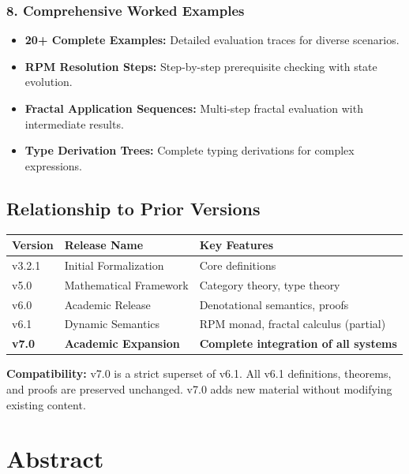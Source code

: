 \documentclass[11pt,twoside,openright]{book}
\theoremstyle{definition}
\theoremstyle{plain}
\theoremstyle{remark}
\begin{document}
\subsection*{8. Comprehensive Worked Examples}

\begin{itemize}
  \item \textbf{20+ Complete Examples:} Detailed evaluation traces for diverse scenarios.
  \item \textbf{RPM Resolution Steps:} Step-by-step prerequisite checking with state evolution.
  \item \textbf{Fractal Application Sequences:} Multi-step fractal evaluation with intermediate results.
  \item \textbf{Type Derivation Trees:} Complete typing derivations for complex expressions.
\end{itemize}

\section*{Relationship to Prior Versions}

\begin{center}
\begin{tabular}{lll}
\toprule
\textbf{Version} & \textbf{Release Name} & \textbf{Key Features} \\
\midrule
v3.2.1 & Initial Formalization & Core definitions \\
v5.0 & Mathematical Framework & Category theory, type theory \\
v6.0 & Academic Release & Denotational semantics, proofs \\
v6.1 & Dynamic Semantics & RPM monad, fractal calculus (partial) \\
\textbf{v7.0} & \textbf{Academic Expansion} & \textbf{Complete integration of all systems} \\
\bottomrule
\end{tabular}
\end{center}

\textbf{Compatibility:} v7.0 is a strict superset of v6.1. All v6.1 definitions, theorems, and proofs are preserved unchanged. v7.0 adds new material without modifying existing content.

\chapter*{Abstract}
\end{document}
